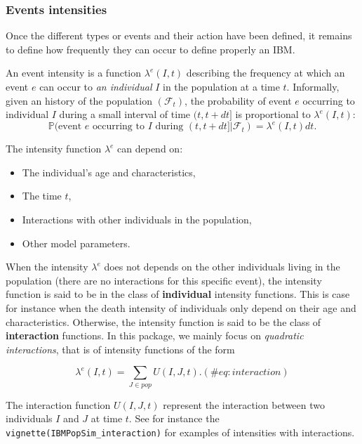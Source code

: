 \hypertarget{Eventintensityth}{%
\subsubsection{Events intensities}\label{Eventintensityth}}

Once the different types or events and their action have been defined, it remains to define how frequently they can occur to define properly an IBM.

An event intensity is a function \(\lambda^e(I,t)\) describing the frequency at which an event \(e\) can occur to \emph{an individual} \(I\) in the population at a time \(t\). Informally, given an history of the population \((\mathcal{F}_t)\), the probability of event \(e\) occurring to individual \(I\) during a small interval of time \((t,t+dt]\) is proportional to \(\lambda^e(I,t)\):
\begin{equation}
  \mathbb{P}(\text{event } e \text{ occurring to $I$ during } (t,t+dt] | \mathcal{F}_t) = \lambda^e(I,t)dt.
\end{equation}

The intensity function \(\lambda^e\) can depend on:

\begin{itemize}
\tightlist
\item
  The individual's age and characteristics,
\item
  The time \(t\),
\item
  Interactions with other individuals in the population,
\item
  Other model parameters.
\end{itemize}

When the intensity \(\lambda^e\) does not depends on the other individuals living in the population (there are no interactions for this specific event), the intensity function is said to be in the class of \textbf{individual} intensity functions. This is case for instance when the death intensity of individuals only depend on their age and characteristics.
Otherwise, the intensity function is said to be the class of \textbf{interaction} functions. In this package, we mainly focus on \emph{quadratic interactions}, that is of intensity functions of the form

\begin{equation}
\lambda^e(I,t) = \sum_{J \in pop} U(I,J,t).
  (\#eq:interaction)
\end{equation}

The interaction function \(U(I,J,t)\) represent the interaction between two individuals \(I\) and \(J\) at time \(t\). See for instance the \texttt{vignette(\textquotesingle{}IBMPopSim\_interaction\textquotesingle{})} for examples of intensities with interactions.

